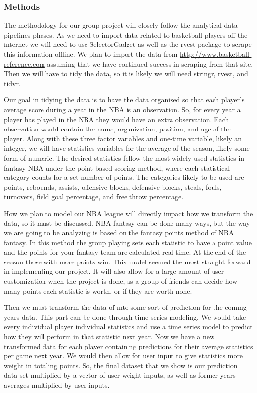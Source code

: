 \documentclass[]{article}
\begin{document}
\subsubsection{Methods}\label{methods}

The methodology for our group project will closely follow the analytical
data pipelines phases. As we need to import data related to basketball
players off the internet we will need to use SelectorGadget as well as
the rvest package to scrape this information offline. We plan to import
the data from \url{http://www.basketball-reference.com} assuming that we
have continued success in scraping from that site. Then we will have to
tidy the data, so it is likely we will need stringr, rvest, and tidyr.

Our goal in tidying the data is to have the data organized so that each
player's average score during a year in the NBA is an observation. So,
for every year a player has played in the NBA they would have an extra
observation. Each observation would contain the name, organization,
position, and age of the player. Along with these three factor variables
and one-time variable, likely an integer, we will have statistics
variables for the average of the season, likely some form of numeric.
The desired statistics follow the most widely used statistics in fantasy
NBA under the point-based scoring method, where each statistical
category counts for a set number of points. The categories likely to be
used are points, rebounds, assists, offensive blocks, defensive blocks,
steals, fouls, turnovers, field goal percentage, and free throw
percentage.

How we plan to model our NBA league will directly impact how we
transform the data, so it must be discussed. NBA fantasy can be done
many ways, but the way we are going to be analyzing is based on the
fantasy points method of NBA fantasy. In this method the group playing
sets each statistic to have a point value and the points for your
fantasy team are calculated real time. At the end of the season those
with more points win. This model seemed the most straight forward in
implementing our project. It will also allow for a large amount of user
customization when the project is done, as a group of friends can decide
how many points each statistic is worth, or if they are worth none.

Then we must transform the data of into some sort of prediction for the
coming years data. This part can be done through time series modeling.
We would take every individual player individual statistics and use a
time series model to predict how they will perform in that statistic
next year. Now we have a new transformed data for each player containing
predictions for their average statistics per game next year. We would
then allow for user input to give statistics more weight in totaling
points. So, the final dataset that we show is our prediction data set
multiplied by a vector of user weight inputs, as well as former years
averages multiplied by user inputs.
\end{document}
